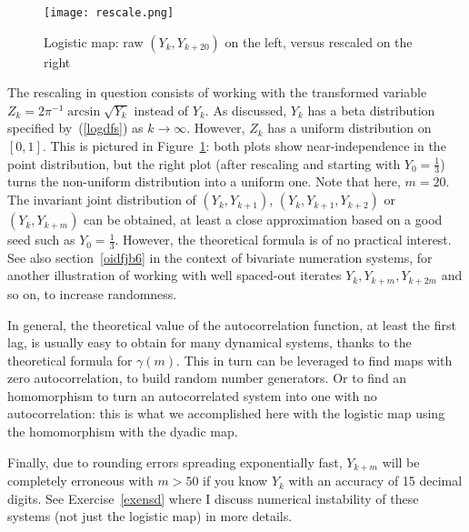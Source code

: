 \documentclass[oneside,10pt]{book}
\begin{document}
\begin{figure}[H]
\centering
\texttt{[image: rescale.png]}  
\caption{Logistic map: raw $(Y_k,Y_{k+20})$ on the left, versus rescaled on the right}
\label{fig:picfrsc}
\end{figure}

The rescaling in question consists of working with the transformed variable $Z_k= 2\pi^{-1}\arcsin\sqrt{Y_k}$ instead of $Y_k$. As discussed, $Y_k$ has a beta distribution specified by~(\ref{logdfs}) as $k\rightarrow\infty$. However, $Z_k$ has a uniform distribution on $[0, 1]$. This is pictured in Figure~\ref{fig:picfrsc}: both plots show near-independence in the point distribution, but the right plot (after rescaling and starting with $Y_0=\frac{1}{3}$) turns the non-uniform distribution into a uniform one. Note that here, $m=20$.
The
  \textcolor{index}{invariant joint distribution} of $(Y_k,Y_{k+1})$, 
$(Y_k, Y_{k+1},Y_{k+2})$ or $(Y_k,Y_{k+m})$ can be obtained, at least
 a close approximation based on a good seed such as $Y_0 =\frac{1}{3}$. However, the theoretical formula is of no practical interest.
See also section~\ref{oidfjb6} in the context of bivariate numeration systems, for another illustration of working with well spaced-out iterates $Y_{k},Y_{k+m},Y_{k+2m}$ and so on, to increase randomness.

 In general, the theoretical value of the 
autocorrelation function, at least the first lag,
 is usually easy to obtain for many dynamical systems, thanks to the theoretical formula for $\gamma(m)$. This in turn can be 
leveraged to find maps with zero autocorrelation, to
 build random number generators. Or to find an homomorphism to turn an autocorrelated system into one with no autocorrelation: this is what we accomplished here with the logistic map using the homomorphism with the dyadic map. 


Finally, due to rounding errors spreading exponentially fast, $Y_{k+m}$ will be completely erroneous with $m>50$ if you know $Y_k$ with an accuracy of 15 decimal digits. See Exercise~\ref{exensd} where I discuss \textcolor{index}{numerical instability}  of these systems (not just the logistic map) in more details. 
\end{document}
